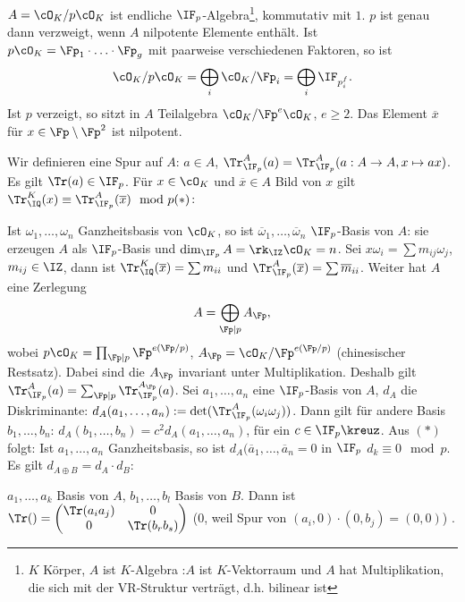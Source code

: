\begin{Beweis}
 $A=\cO_K/p\cO_K$ ist endliche $\IF_p$-Algebra\footnote{$K$ Körper, $A$ ist $K$-Algebra :\gdw $A$ ist $K$-Vektorraum und $A$ hat Multiplikation, die sich mit der VR-Struktur verträgt, d.h. bilinear ist}, kommutativ mit $1$. $p$ ist genau dann verzweigt, wenn $A$ nilpotente Elemente enthält.
 Ist $p\cO_K=\Fp_1\cdot\ldots\cdot\Fp_g$ mit paarweise verschiedenen Faktoren, so ist
 \[\cO_K/p\cO_K = \bigoplus_i \cO_K/\Fp_i=\bigoplus_i \IF_{p^f_i}. \]
 Ist $p$ verzeigt, so sitzt in $A$ Teilalgebra $\cO_K/\Fp^e\cO_K$, $e\geq 2$. Das Element $\overline{x}$ für $x\in\Fp\setminus\Fp^2$ ist nilpotent.
 
 Wir definieren eine Spur auf $A$: $a\in A$, $\Tr_{\IF_p}^A(a)=\Tr_{\IF_p}^A(a:A\rightarrow A, x\mapsto ax)$. Es gilt $\Tr(a)\in \IF_p$. Für $x\in\cO_K$ und $\overline{x}\in A$ Bild von $x$ gilt $\Tr_\IQ^K(x)\equiv\Tr_{\IF_p}^A(\overline{x})\mod{p} (*)$:
 
 Ist $\omega_1,\ldots,\omega_n$ Ganzheitsbasis von $\cO_K$, so ist $\overline\omega_1,\ldots,\overline\omega_n$ $\IF_p$-Basis von $A$: sie erzeugen $A$ als $\IF_p$-Basis und $\dim_{\IF_p} A=\rk_\IZ \cO_K = n$.
 Sei $x\omega_i=\sum m_{ij}\omega_j$, $m_{ij}\in\IZ$, dann ist $\Tr_\IQ^K(\overline x)=\sum m_{ii}$ und $\Tr_{\IF_p}^A(\overline x)=\sum\overline m_{ii}$. Weiter hat $A$ eine Zerlegung \[ A=\bigoplus_{\Fp\mid p} A_\Fp,\]
 wobei $p\cO_K=\prod_{\Fp\mid p} \Fp^{e(\Fp/p)}$, $A_\Fp=\cO_K/\Fp^{e(\Fp/p)}$ (chinesischer Restsatz). Dabei sind die $A_\Fp$ invariant unter Multiplikation. Deshalb gilt $\Tr_{\IF_p}^A(a) = \sum_{\Fp\mid p} \Tr_{\IF_p}^{A_\Fp}(a)$. Sei $a_1,\ldots,a_n$ eine $\IF_p$-Basis von $A$, $d_A$ die Diskriminante: $d_A(a_1,\ldots,a_n):=\det(\Tr_{\IF_p}^A(\omega_i\omega_j))$. Dann gilt für andere Basis $b_1,\ldots,b_n$: $d_A(b_1,\ldots,b_n)=c^2d_A(a_1,\ldots,a_n)$, für ein $c\in\IF_p\kreuz$. Aus $(*)$ folgt: Ist $a_1,\ldots,a_n$ Ganzheitsbasis, so ist $d_A(\overline a_1,\ldots,\overline a_n=0$ in $\IF_p$ \gdw $d_k\equiv 0\mod{p}$. Es gilt $d_{A\oplus B}=d_A\cdot d_B$:
 
 $a_1,\ldots,a_k$ Basis von $A$, $b_1,\ldots,b_l$ Basis von $B$. Dann ist $\Tr()=\begin{pmatrix}
                                                                                  \Tr(a_ia_j) & 0\\
                                                                                  0 & \Tr(b_rb_s)
                                                                                 \end{pmatrix} $ ($0$, weil Spur von $(a_i,0)\cdot (0,b_j)=(0,0)$) .
                                                                                 

\end{Beweis}

